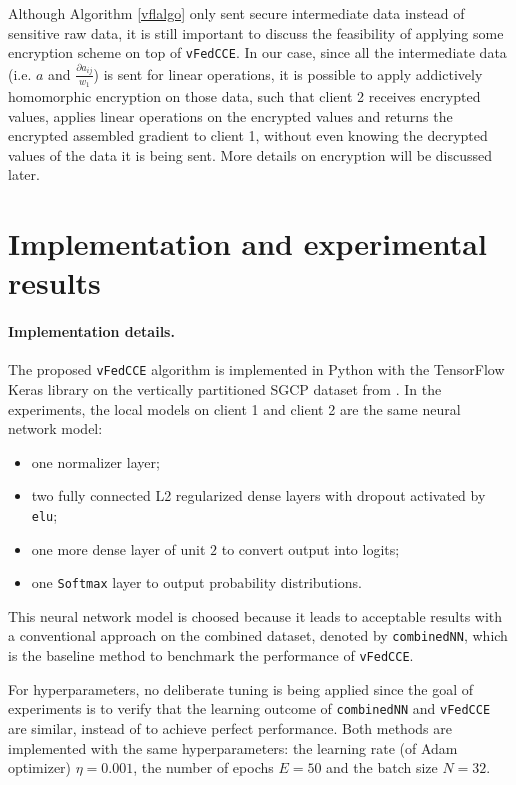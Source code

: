 \documentclass{article}
\begin{document}
Although Algorithm \ref{vflalgo} only sent secure intermediate data instead of sensitive raw data, it is still important to discuss the feasibility of applying some encryption scheme on top of \texttt{vFedCCE}. In our case, since all the intermediate data (i.e. $a$ and $\frac{\partial a_{ij}}{w_1}$) is sent for linear operations, it is possible to apply addictively homomorphic encryption on those data, such that client 2 receives encrypted values, applies linear operations on the encrypted values and returns the encrypted assembled gradient to client 1, without even knowing the decrypted values of the data it is being sent. More details on encryption will be discussed later.

\section{Implementation and experimental results}\label{vflexp}
\paragraph{Implementation details.} The proposed \texttt{vFedCCE} algorithm is implemented in Python with the TensorFlow Keras library on the vertically partitioned SGCP dataset from \cite{groemping2019south}. In the experiments, the local models on client 1 and client 2 are the same neural network model:
\begin{itemize}
  \setlength\itemsep{0em}
  \item one normalizer layer;
  \item two fully connected L2 regularized dense layers with dropout activated by \texttt{elu};
  \item one more dense layer of unit $2$ to convert output into logits;
  \item one \texttt{Softmax} layer to output probability distributions.
\end{itemize}
This neural network model is choosed because it leads to acceptable results with a conventional approach on the combined dataset, denoted by \texttt{combinedNN}, which is the baseline method to benchmark the performance of \texttt{vFedCCE}.

For hyperparameters, no deliberate tuning is being applied since the goal of experiments is to verify that the learning outcome of \texttt{combinedNN} and \texttt{vFedCCE} are similar, instead of to achieve perfect performance. Both methods are implemented with the same hyperparameters: the learning rate (of Adam optimizer) $\eta=0.001$, the number of epochs $E=50$ and the batch size $N=32$.
\end{document}
